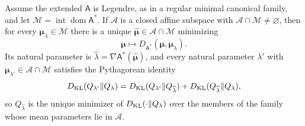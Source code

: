 Assume the extended \(\mathsf A\) is Legendre, as in a regular minimal
canonical family, and let
\(\mathcal M=\operatorname{int}\operatorname{dom}\mathsf A^\ast\). If
\(\mathscr A\) is a closed affine subspace with
\(\mathscr A\cap\mathcal M\neq\varnothing\), then for every
\(\boldsymbol\mu_\lambda\in\mathcal M\) there is a unique
\(\widehat{\boldsymbol\mu}\in\mathscr A\cap\mathcal M\) minimizing
\begin{equation}
\boldsymbol\mu\longmapsto
D_{\mathsf A^\ast}(\boldsymbol\mu,\boldsymbol\mu_\lambda).
\label{eq:exp-mean-projection}
\end{equation}
Its natural parameter is
\(\widehat\lambda=\nabla\mathsf A^\ast(\widehat{\boldsymbol\mu})\), and every
natural parameter \(\lambda'\) with \(\boldsymbol\mu_{\lambda'}\in\mathscr A\cap\mathcal M\)
satisfies the Pythagorean identity
\begin{equation}
D_{\mathrm{KL}}(Q_{\lambda'}\Vert Q_\lambda)
=D_{\mathrm{KL}}(Q_{\lambda'}\Vert Q_{\widehat\lambda})
+D_{\mathrm{KL}}(Q_{\widehat\lambda}\Vert Q_\lambda),
\label{eq:exp-projection-pythagorean}
\end{equation}
so \(Q_{\widehat\lambda}\) is the unique minimizer of
\(D_{\mathrm{KL}}(\cdot\Vert Q_\lambda)\) over the members of the family whose mean
parameters lie in \(\mathscr A\). 

